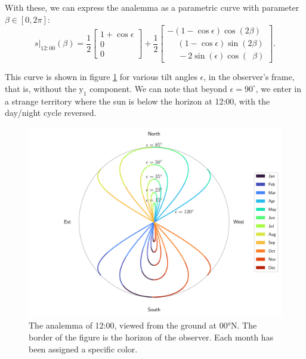 \documentclass[12pt]{article}
\begin{document}
With these, we can express the analemma as a 
parametric curve with parameter 
$\beta \in [0,2\pi]$:
\begin{equation}
    s\vert_{12:00}(\beta) =
    \frac{1}{2}
    \begin{bmatrix}
        1+\cos\epsilon\\
        0\\
        0
    \end{bmatrix}+
    \frac{1}{2}
    \begin{bmatrix}
        - (1-\cos\epsilon) \cos(2\beta)\\
        \phantom{+} (1-\cos\epsilon) \sin(2\beta)\\
        \quad\;-2\sin(\epsilon) \cos(\phantom{2}\beta)
    \end{bmatrix}.
\end{equation}

This curve is shown in figure \ref{fig:analemma_easy} for various 
tilt angles $\epsilon$, in the observer's frame, that is, without the 
$\mathrm{y}_1$ component. We can note that beyond $\epsilon=90^\circ$, we
enter in a strange territory where the sun is below the horizon at 12:00, with
the day/night cycle reversed.
\begin{figure}[ht]
    \centering
    \includegraphics[width=\textwidth]{./analemma_plot.pdf}
    \caption{
        The analemma of 12:00, viewed from the ground at 00°N. 
        The border of the figure is the horizon of the observer. 
        Each month has been assigned a specific color.
    }
    \label{fig:analemma_easy}
\end{figure}
\end{document}
